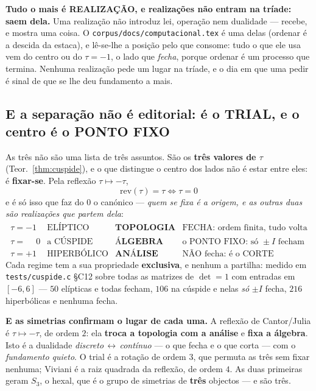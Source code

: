 \documentclass[11pt,a4paper]{article}
\newcommand{\code}[1]{\texttt{\small #1}}
\begin{document}
\textbf{Tudo o mais é REALIZAÇÃO, e realizações não entram na tríade: saem dela.} Uma
realização não introduz lei, operação nem dualidade --- recebe, e mostra uma coisa. O
\code{corpus/docs/computacional.tex} é uma delas (ordenar é a descida da estaca), e
lê-se-lhe a posição pelo que consome: tudo o que ele usa vem do centro ou do $\tau=-1$, o
lado que \emph{fecha}, porque ordenar é um processo que termina. Nenhuma realização pede um
lugar na tríade, e o dia em que uma pedir é sinal de que se lhe deu fundamento a mais.

\subsection*{E a separação não é editorial: é o TRIAL, e o centro é o PONTO FIXO}

As três não são uma lista de três assuntos. São os \textbf{três valores de $\tau$}
(Teor.~\ref{thm:cuspide}), e o que distingue o centro dos lados não é estar entre eles:
é \textbf{fixar-se}. Pela reflexão $\tau\mapsto-\tau$,
\[
\boxed{\;\mathrm{rev}(\tau)=\tau\iff\tau=0\;}
\]
e é só isso que faz do $0$ o canónico --- \emph{quem se fixa é a origem, e as outras duas
são realizações que partem dela}:
\[
\begin{array}{clll}
\tau=-1 & \text{ELÍPTICO} & \textbf{TOPOLOGIA} & \text{FECHA: ordem finita, tudo volta}\\[2pt]
\tau=\phantom{-}0 & \text{a CÚSPIDE} & \textbf{ÁLGEBRA} & \text{o PONTO FIXO: só }\pm I\text{ fecham}\\[2pt]
\tau=+1 & \text{HIPERBÓLICO} & \textbf{ANÁLISE} & \text{NÃO fecha: é o CORTE}
\end{array}
\]
Cada regime tem a sua propriedade \textbf{exclusiva}, e nenhum a partilha: medido em
\code{tests/cuspide.c} \S C12 sobre todas as matrizes de $\det=1$ com entradas em
$[-6,6]$ --- $50$ elípticas e todas fecham, $106$ na cúspide e nelas \emph{só} $\pm I$
fecha, $216$ hiperbólicas e nenhuma fecha.

\medskip
\noindent\textbf{E as simetrias confirmam o lugar de cada uma.} A reflexão de
Cantor/Julia é $\tau\mapsto-\tau$, de ordem $2$: ela \textbf{troca a topologia com a
análise} e \textbf{fixa a álgebra}. Isto é a dualidade \emph{discreto\,$\leftrightarrow$\,contínuo}
--- o que fecha e o que corta --- com o \emph{fundamento quieto}. O trial é a rotação de
ordem $3$, que permuta as três sem fixar nenhuma; Viviani é a raiz quadrada da reflexão,
de ordem $4$. As duas primeiras geram $S_3$, o hexal, que é o grupo de simetrias de
\textbf{três} objectos --- e são três.
\end{document}

